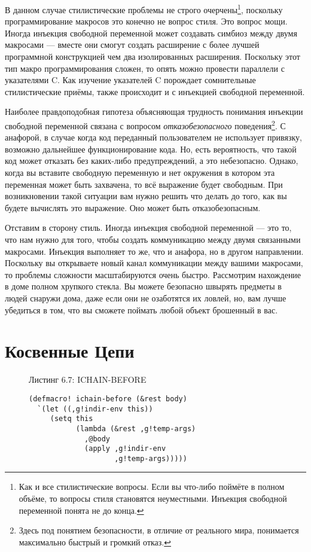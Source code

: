 В данном случае стилистические проблемы не строго очерчены\footnote{Как и все стилистические вопросы. Если вы что-либо поймёте в полном объёме, то вопросы стиля становятся неуместными. Инъекция свободной переменной понята не до конца.}, поскольку программирование макросов это конечно не вопрос стиля. Это вопрос мощи. Иногда инъекция свободной переменной может создавать симбиоз между двумя макросами --- вместе они смогут создать расширение с более лучшей программной конструкцией чем два изолированных расширения. Поскольку этот тип макро программирования сложен, то опять можно провести параллели с указателями C. Как изучение указателей C порождает сомнительные стилистические приёмы, также происходит и с инъекцией свободной переменной.

Наиболее правдоподобная гипотеза объясняющая трудность понимания инъекции свободной переменной связана с вопросом \emph{отказобезопасного} поведения\footnote{Здесь под понятием безопасности, в отличие от реального мира, понимается максимально быстрый и громкий отказ.}. С анафорой, в случае когда код переданный пользователем не использует привязку, возможно дальнейшее функционирование кода. Но, есть вероятность, что такой код может отказать без каких-либо предупреждений, а это небезопасно. Однако, когда вы вставите свободную переменную и нет окружения в котором эта переменная может быть захвачена, то всё выражение будет свободным. При возникновении такой ситуации вам нужно решить что делать до того, как вы будете вычислять это выражение. Оно может быть отказобезопасным.

Отставим в сторону стиль. Иногда инъекция свободной переменной --- это то, что нам нужно для того, чтобы создать коммуникацию между двумя связанными макросами. Инъекция выполняет то же, что и анафора, но в другом направлении. Поскольку вы открываете новый канал коммуникации между вашими макросами, то проблемы сложности масштабируются очень быстро. Рассмотрим нахождение в доме полном хрупкого стекла. Вы можете безопасно швырять предметы в людей снаружи дома, даже если они не озаботятся их ловлей, но, вам лучше убедиться в том, что вы сможете поймать любой объект брошенный в вас.

\section{Косвенные Цепи}\label{section_indirection_chains}



\begin{figure}Листинг 6.7: ICHAIN-BEFORE\label{listing_6.7}
\listbegin
\begin{verbatim}
(defmacro! ichain-before (&rest body)
  `(let ((,g!indir-env this))
     (setq this
           (lambda (&rest ,g!temp-args)
             ,@body
             (apply ,g!indir-env
                    ,g!temp-args)))))
\end{verbatim}
\listend
\end{figure}

